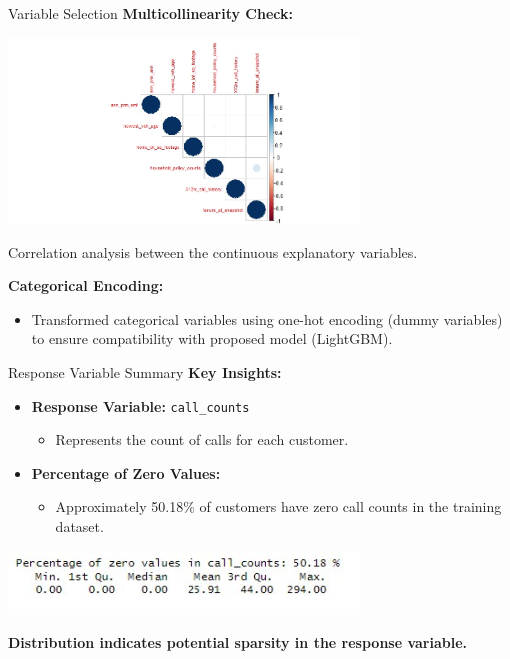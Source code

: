 \documentclass{beamer}\usepackage[]{graphicx}\usepackage[]{xcolor}
\begin{document}
\begin{frame}{Variable Selection}
\textbf{Multicollinearity Check:}
\vspace{-0.2cm}
\begin{center}
    \includegraphics[width=0.7\textwidth]{Rplot1.jpeg}
    \vspace{0.2cm} %
    
    \footnotesize{Correlation analysis between the continuous explanatory variables.}
\end{center}

\textbf{Categorical Encoding:}
\begin{itemize}
    \item Transformed categorical variables using one-hot encoding (dummy variables) to ensure compatibility with proposed model (LightGBM).
\end{itemize}

\end{frame}

\begin{frame}{Response Variable Summary}
\textbf{Key Insights:}
\begin{itemize}
    \item \textbf{Response Variable:} \texttt{call\_counts}
    \begin{itemize}
        \item Represents the count of calls for each customer.
    \end{itemize}
    \item \textbf{Percentage of Zero Values:}
    \begin{itemize}
        \item Approximately 50.18\% of customers have zero call counts in the training dataset.
    \end{itemize}
\end{itemize}

\begin{center}
    \includegraphics[width=0.7\textwidth]{Response.jpg}
\end{center}

\textbf{Distribution indicates potential sparsity in the response variable.}
\end{frame}
\end{document}
